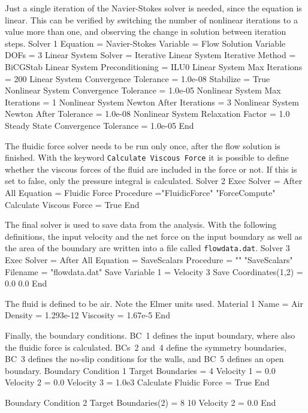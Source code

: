 Just a single iteration of the Navier-Stokes solver is needed, since
the equation is linear. This can be verified by switching the number
of nonlinear iterations to a value more than one, and observing the
change in solution between iteration steps.
\ttbegin
Solver 1
   Equation = Navier-Stokes
   Variable = Flow Solution
   Variable DOFs = 3
   Linear System Solver = Iterative
   Linear System Iterative Method = BiCGStab
   Linear System Preconditioning = ILU0
   Linear System Max Iterations = 200
   Linear System Convergence Tolerance = 1.0e-08
   Stabilize = True
   Nonlinear System Convergence Tolerance = 1.0e-05
   Nonlinear System Max Iterations = 1
   Nonlinear System Newton After Iterations = 3
   Nonlinear System Newton After Tolerance = 1.0e-08
   Nonlinear System Relaxation Factor = 1.0
   Steady State Convergence Tolerance = 1.0e-05
End
\ttend

The fluidic force solver needs to be run only once, after the flow
solution is finished. With the keyword {\tt Calculate Viscous Force} it
is possible to define whether the viscous forces of the fluid are
included in the force or not. If this is set to false, only the
pressure integral is calculated.
\ttbegin
Solver 2
  Exec Solver = After All
  Equation = Fluidic Force
  Procedure  ="FluidicForce" "ForceCompute"
  Calculate Viscous Force = True
End
\ttend

The final solver is used to save data from the analysis. With the
following definitions, the input velocity and the net force on the
input boundary as well as the area of the boundary are written into a
file called {\tt flowdata.dat}.
\ttbegin
Solver 3
  Exec Solver = After All
  Equation = SaveScalars
  Procedure = "" "SaveScalars"
  Filename = "flowdata.dat"
  Save Variable 1 = Velocity 3
  Save Coordinates(1,2) = 0.0 0.0
End
\ttend

The fluid is defined to be air. Note the Elmer  units used.
\ttbegin
Material 1
  Name = Air
  Density = 1.293e-12
  Viscosity = 1.67e-5
End
\ttend

Finally, the boundary conditions. BC~1 defines the input boundary,
where also the fluidic force is calculated. BCs~2 and~4 define the
symmetry boundaries, BC~3 defines the no-slip conditions for the
walls, and BC~5 defines an open boundary.
\ttbegin
Boundary Condition 1
  Target Boundaries = 4
   Velocity 1 = 0.0
   Velocity 2 = 0.0
   Velocity 3 = 1.0e3
   Calculate Fluidic Force = True
End

Boundary Condition 2
  Target Boundaries(2) = 8 10
   Velocity 2 = 0.0
End

